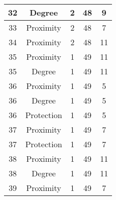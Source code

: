 \documentclass[results.tex]{subfiles}
\begin{document}
\begin{center}
\begin{tabular}{| c || c | c | c | c |}
            \hline
            32                      & Degree                       & 2                      & 48                      & 9                    \\
            \hline
            33                      & Proximity                    & 2                      & 48                      & 7                    \\
            \hline
            34                      & Proximity                    & 2                      & 48                      & 11                   \\
            \hline
            35                      & Proximity                    & 1                      & 49                      & 11                   \\
            \hline
            35                      & Degree                       & 1                      & 49                      & 11                   \\
            \hline
            36                      & Proximity                    & 1                      & 49                      & 5                    \\
            \hline
            36                      & Degree                       & 1                      & 49                      & 5                    \\
            \hline
            36                      & Protection                   & 1                      & 49                      & 5                    \\
            \hline
            37                      & Proximity                    & 1                      & 49                      & 7                    \\
            \hline
            37                      & Protection                   & 1                      & 49                      & 7                    \\
            \hline
            38                      & Proximity                    & 1                      & 49                      & 11                   \\
            \hline
            38                      & Degree                       & 1                      & 49                      & 11                   \\
            \hline
            39                      & Proximity                    & 1                      & 49                      & 7                    \\

\end{tabular}
\end{center}
\end{document}
